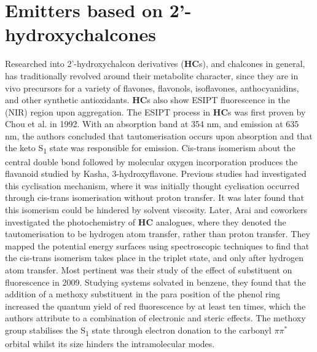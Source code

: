 \section{Emitters based on 2'-hydroxychalcones}\label{section: lom HC}
Researched into 2'-hydroxychalcon derivatives (\textbf{HC}s), and chalcones in general, has traditionally revolved around their metabolite character, since they are in vivo precursors for a variety of flavones, flavonols, isoflavones, anthocyanidins, and other synthetic antioxidants.\cite{Singh2014} \textbf{HC}s also show ESIPT fluorescence in the (NIR) region upon aggregation. The ESIPT process in \textbf{HC}s was first proven by Chou et al. in 1992.\cite{Chou1992} With an absorption band at 354 nm, and emission at 635 nm, the authors concluded that tautomerisation occurs upon absorption and that the keto S\textsubscript{1} state was responsible for emission. Cis-trans isomerism about the central double bond followed by molecular oxygen incorporation produces the flavanoid studied by Kasha, 3-hydroxyflavone. Previous studies had investigated this cyclisation mechanism, where it was initially thought cyclisation occurred through cis-trans isomerisation without proton transfer.\cite{Stermitz1975,Matsushima1985} It was later found that this isomerism could be hindered by solvent viscosity.\cite{Tokumura1998} Later, Arai and coworkers investigated the photochemistry of \textbf{HC} analogues, where they denoted the tautomerisation to be hydrogen atom transfer, rather than proton transfer.\cite{Arai1997,Norikane2002,Norikane2003,Kaneda2003,Kaneda2003a,Kaneda2004,Teshima2009} They mapped the potential energy surfaces using spectroscopic techniques to find that the cis-trans isomerism takes place in the triplet state, and only after hydrogen atom transfer. Most pertinent was their study of the effect of substituent on fluorescence in 2009.\cite{Teshima2009}  Studying systems solvated in benzene, they found that the addition of a methoxy substituent in the para position of the phenol ring increased the quantum yield of red fluorescence by at least ten times, which the authors attribute to a combination of electronic and steric effects. The methoxy group stabilises the S\textsubscript{1} state through electron donation to the carbonyl $\pi\pi^\ast$ orbital whilst its size hinders the intramolecular modes. 

